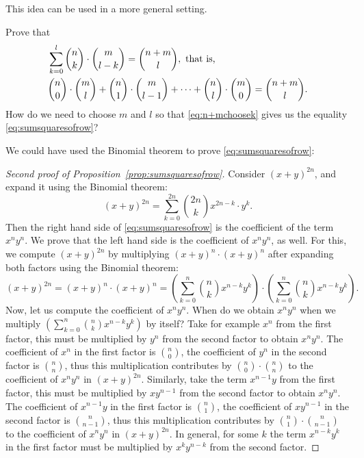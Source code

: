 This idea can be used in a more general setting. 
\begin{exercise}\label{ex:n+mchoosek}
Prove that 
\begin{align}\label{eq:n+mchoosek}
\notag & \sum_{k=0}^l \binom{n}{k} \cdot \binom{m}{l-k} = \binom{n+m}{l}, \text{ that is, } \\
& \binom{n}{0} \cdot \binom{m}{l} + \binom{n}{1} \cdot \binom{m}{l-1} + \dots + \binom{n}{l} \cdot \binom{m}{0}= \binom{n+m}{l}. 
\end{align}
How do we need to choose $m$ and $l$ so that \eqref{eq:n+mchoosek} gives us the equality \eqref{eq:sumsquaresofrow}? 
\end{exercise}

We could have used the Binomial theorem to prove \eqref{eq:sumsquaresofrow}: 
\begin{proof}[Second proof of Proposition~\ref{prop:sumsquaresofrow}]
Consider $(x+y)^{2n}$, and expand it using the Binomial theorem: 
\[
(x+y)^{2n} = \sum_{k=0}^{2n} \binom{2n}{k} x^{2n-k} \cdot y^{k}. 
\]
Then the right hand side of \eqref{eq:sumsquaresofrow} is the coefficient of the term $x^ny^n$. 
We prove that the left hand side is the coefficient of $x^ny^n$, as well. 
For this, we compute $(x+y)^{2n}$ by multiplying $(x+y)^n \cdot (x+y)^n$ after expanding both factors using the Binomial theorem: 
\[
(x+y)^{2n} = (x+y)^n \cdot (x+y)^n = \left( \sum_{k=0}^n \binom{n}{k} x^{n-k}y^k \right) \cdot \left( \sum_{k=0}^n \binom{n}{k} x^{n-k}y^k \right). 
\]
Now, let us compute the coefficient of $x^n y^n$. 
When do we obtain $x^n y^n$ when we multiply $\left( \sum_{k=0}^n \binom{n}{k} x^{n-k}y^k \right) $ by itself? 
Take for example $x^n$ from the first factor, this must be multiplied by $y^n$ from the second factor to obtain $x^n y^n$. 
The coefficient of $x^n$ in the first factor is $\binom{n}{0}$, the coefficient of $y^n$ in the second factor is $\binom{n}{n}$, 
thus this multiplication contributes by $\binom{n}{0} \cdot \binom{n}{n}$ to the coefficient of $x^n y^n $ in $(x+y)^{2n}$. 
Similarly, take the term $x^{n-1}y$ from the first factor, this must be multiplied by $xy^{n-1}$ from the second factor to obtain $x^n y^n$. 
The coefficient of $x^{n-1}y$ in the first factor is $\binom{n}{1}$, the coefficient of $xy^{n-1}$ in the second factor is $\binom{n}{n-1}$, 
thus this multiplication contributes by $\binom{n}{1} \cdot \binom{n}{n-1}$ to the coefficient of $x^n y^n $ in $(x+y)^{2n}$. 
In general, for some $k$ the term $x^{n-k}y^k$ in the first factor must be multiplied by $x^k y^{n-k}$ from the second factor. 

\end{proof}
